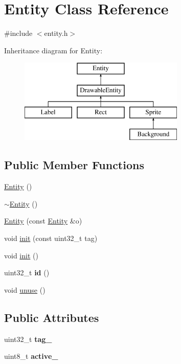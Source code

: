 \hypertarget{class_entity}{}\section{Entity Class Reference}
\label{class_entity}


{\ttfamily \#include $<$entity.\+h$>$}

Inheritance diagram for Entity\+:\begin{figure}[H]
\begin{center}
\leavevmode
\includegraphics[height=4.000000cm]{class_entity}
\end{center}
\end{figure}
\subsection*{Public Member Functions}
\begin{DoxyCompactItemize}
\item 
\hyperlink{class_entity_a980f368aa07ce358583982821533a54a}{Entity} ()
\item 
\hyperlink{class_entity_adf6d3f7cb1b2ba029b6b048a395cc8ae}{$\sim$\+Entity} ()
\item 
\hyperlink{class_entity_ad758dc48d715e48ada4193517f1d32ea}{Entity} (const \hyperlink{class_entity}{Entity} \&o)
\item 
void \hyperlink{class_entity_a085fa2dd2c2b1f3f60d601a68d5c6773}{init} (const uint32\+\_\+t tag)
\item 
void \hyperlink{class_entity_a93bfb0b92c06297c207fad4164810fed}{init} ()
\item 
\mbox{\label{class_entity_ae4a75e659a4426f57f5c1d44f1b8ef34}} 
uint32\+\_\+t {\bfseries id} ()
\item 
void \hyperlink{class_entity_ad40f9e3ddaa375d33c930c6b57f4c9c5}{unuse} ()
\end{DoxyCompactItemize}
\subsection*{Public Attributes}
\begin{DoxyCompactItemize}
\item 
\mbox{\label{class_entity_a8003da23696e58c9904b80b952ba802f}} 
uint32\+\_\+t {\bfseries tag\+\_\+}
\item 
\mbox{\label{class_entity_a7816e789062febe058b98ce695539c59}} 
uint8\+\_\+t {\bfseries active\+\_\+}
\end{DoxyCompactItemize}


